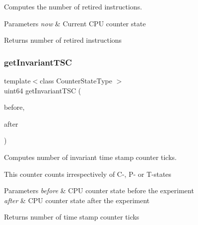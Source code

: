 Computes the number of retired instructions. 


\begin{DoxyParams}{Parameters}
{\em now} & Current C\+PU counter state \\
\hline
\end{DoxyParams}
\begin{DoxyReturn}{Returns}
number of retired instructions 
\end{DoxyReturn}
\mbox{\label{class_basic_counter_state_a45cf07a8d3ce2c48968842554a3854f9}} 
\subsubsection{\texorpdfstring{get\+Invariant\+T\+SC}{getInvariantTSC}}
{\footnotesize\ttfamily template$<$class Counter\+State\+Type $>$ \\
uint64 get\+Invariant\+T\+SC (\begin{DoxyParamCaption}\item[{const Counter\+State\+Type \&}]{before,  }\item[{const Counter\+State\+Type \&}]{after }\end{DoxyParamCaption})\hspace{0.3cm}{\ttfamily [friend]}}



Computes number of invariant time stamp counter ticks. 

This counter counts irrespectively of C-\/, P-\/ or T-\/states


\begin{DoxyParams}{Parameters}
{\em before} & C\+PU counter state before the experiment \\
\hline
{\em after} & C\+PU counter state after the experiment \\
\hline
\end{DoxyParams}
\begin{DoxyReturn}{Returns}
number of time stamp counter ticks 
\end{DoxyReturn}
\mbox{\label{class_basic_counter_state_a7b0019d24a77dc05b7e47cb98192fd22}} 
